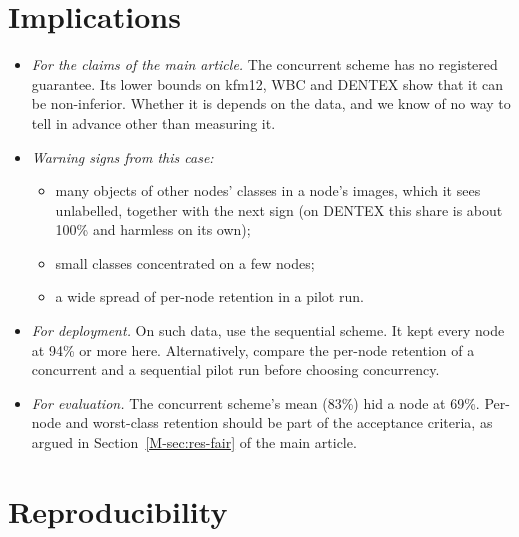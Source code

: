 \documentclass[pdflatex,sn-mathphys-num]{sn-jnl}
\begin{document}
\section{Implications}\label{sec:s-implications}

\begin{itemize}
\item \emph{For the claims of the main article.} The concurrent scheme has no registered guarantee. Its lower bounds on kfm12, WBC and DENTEX show that it can be non-inferior. Whether it is depends on the data, and we know of no way to tell in advance other than measuring it.
\item \emph{Warning signs from this case:}
  \begin{itemize}
  \item many objects of other nodes' classes in a node's images, which it sees unlabelled, together with the next sign (on DENTEX this share is about 100\% and harmless on its own);
  \item small classes concentrated on a few nodes;
  \item a wide spread of per-node retention in a pilot run.
  \end{itemize}
\item \emph{For deployment.} On such data, use the sequential scheme. It kept every node at 94\% or more here. Alternatively, compare the per-node retention of a concurrent and a sequential pilot run before choosing concurrency.
\item \emph{For evaluation.} The concurrent scheme's mean (83\%) hid a node at 69\%. Per-node and worst-class retention should be part of the acceptance criteria, as argued in Section~\ref{M-sec:res-fair} of the main article.
\end{itemize}

\section{Reproducibility}\label{sec:s-repro}
\end{document}
